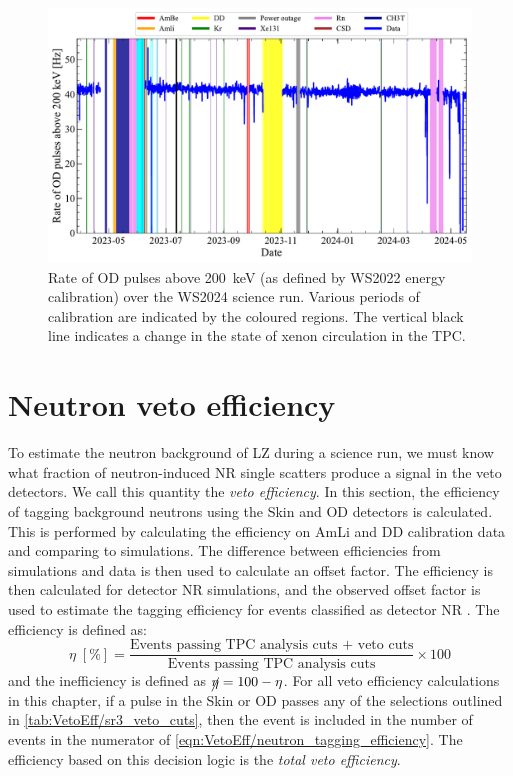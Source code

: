 \begin{figure}[!h]
	\centering
	\includegraphics[width=\textwidth]{figures/VetoEfficiency/prem_od_stability.pdf}
	\caption[Rate of OD pulses above 200~keV over the WS2024 science run.]{Rate of OD pulses above 200~keV (as defined by WS2022 energy calibration) over the WS2024 science run. Various periods of calibration are indicated by the coloured regions. The vertical black line indicates a change in the state of xenon circulation in the TPC.}
	\label{fig:VetoEff/deadtime_stability_prem}
\end{figure}

\section{Neutron veto efficiency}\label{sec:VetoEff/efficiency}
To estimate the neutron background of LZ during a science run, we must know what fraction of neutron-induced NR single scatters produce a signal in the veto detectors. We call this quantity the \textit{veto efficiency}.
In this section, the efficiency of tagging background neutrons using the Skin and OD detectors is calculated.
This is performed by calculating the efficiency on AmLi and DD calibration data and comparing to simulations.
The difference between efficiencies from simulations and data is then used to calculate an offset factor.
The efficiency is then calculated for detector NR simulations, and the observed offset factor is used to estimate the tagging efficiency for events classified as detector NR \cite{LZ:2022ysc,LZ:2024zvo}.
The efficiency is defined as:
\begin{equation}\label{eqn:VetoEff/neutron_tagging_efficiency}
	\eta\;[\%] = \frac{\textrm{Events passing TPC analysis cuts + veto cuts}}{\textrm{Events passing TPC analysis cuts}} \times 100
\end{equation}
and the inefficiency is defined as $\cancel{\eta}=100-\eta$. For all veto efficiency calculations in this chapter, if a pulse in the Skin or OD passes any of the selections outlined in \autoref{tab:VetoEff/sr3_veto_cuts}, then the event is included in the number of events in the numerator of \autoref{eqn:VetoEff/neutron_tagging_efficiency}. The efficiency based on this decision logic is the \textit{total veto efficiency}.

